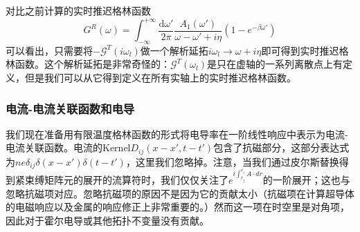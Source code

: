 \documentclass{article}
\numberwithin{equation}{subsection}
\begin{document}
对比之前计算的实时推迟格林函数
\begin{equation}
    G^R(\omega)=\int_{-\infty}^{+\infty}\frac{\mathrm{d}\omega'}{2\pi}\frac{A_1(\omega')}{\omega-\omega'+i\eta}(1-e^{-\beta\omega'})
\end{equation}
可以看出，只需要将$-\mathcal{G}^T(i\omega_l)$做一个解析延拓$i\omega_l\rightarrow\omega+i\eta$即可得到实时推迟格林函数。这个解析延拓是非常奇怪的：$\mathcal{G}^T(\omega_l)$是只在虚轴的一系列离散点上有定义，但是我们可以从它得到定义在所有实轴上的实时推迟格林函数。
\subsubsection{电流-电流关联函数和电导}
我们现在准备用有限温度格林函数的形式将电导率在一阶线性响应中表示为电流-电流关联函数。电流的Kernel$D_{ij}(x-x',t-t')$包含了抗磁部分，这部分表达式为$ne\delta_{ij}\delta(x-x')\delta(t-t')$，这里我们忽略掉。注意，当我们通过皮尔斯替换得到紧束缚矩阵元的展开的流算符时，我们仅仅关注了$e^{i\int_{r_j}^{r_i}A\cdot dr}$的一阶展开；这也与忽略抗磁项对应。忽略抗磁项的原因不是因为它的贡献太小（抗磁项在计算超导体的电磁响应以及金属的响应修正上非常重要的。）然而这一项在时空里是对角项，因此对于霍尔电导或其他拓扑不变量没有贡献。
\end{document}
